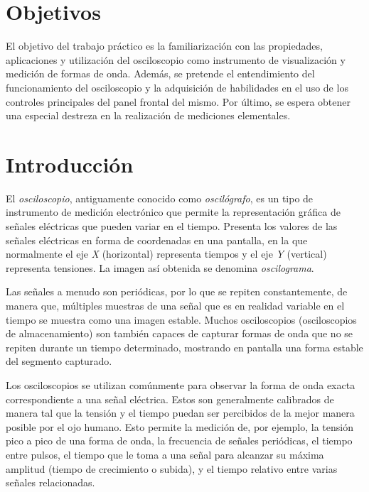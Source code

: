 \documentclass{article}
\begin{document}
\section{Objetivos}

	El objetivo del trabajo práctico es la familiarización con las propiedades, aplicaciones y utilización del osciloscopio como instrumento de visualización y medición de formas de onda. Además, se pretende el entendimiento del funcionamiento del osciloscopio y la adquisición de habilidades en el uso de los controles principales del panel frontal del mismo. Por último, se espera obtener una especial destreza en la realización de mediciones elementales.
\bigskip\bigskip




\section{Introducción}

	El \textit{osciloscopio}, antiguamente conocido como \textit{oscilógrafo}, es un tipo de instrumento de medición electrónico que permite la representación gráfica de señales eléctricas que pueden variar en el tiempo. Presenta los valores de las señales eléctricas en forma de coordenadas en una pantalla, en la que normalmente el eje \textit{X} (horizontal) representa tiempos y el eje \textit{Y} (vertical) representa tensiones. La imagen así obtenida se denomina \textit{oscilograma}. 
	\par
	Las señales a menudo son periódicas, por lo que se repiten constantemente, de manera que, múltiples muestras de una señal que es en realidad variable en el tiempo se muestra como una imagen estable. Muchos osciloscopios (osciloscopios de almacenamiento) son también capaces de capturar formas de onda que no se repiten durante un tiempo determinado, mostrando en pantalla una forma estable del segmento capturado.
	\par
	Los osciloscopios se utilizan comúnmente para observar la forma de onda exacta correspondiente a una señal eléctrica. Estos son generalmente calibrados de manera tal que la tensión y el tiempo puedan ser percibidos de la mejor manera posible por el ojo humano. Esto permite la medición de, por ejemplo, la tensión pico a pico de una forma de onda, la frecuencia de señales periódicas, el tiempo entre pulsos, el tiempo que le toma a una señal para alcanzar su máxima amplitud (tiempo de crecimiento o subida), y el tiempo relativo entre varias señales relacionadas.
\bigskip\bigskip
\end{document}
